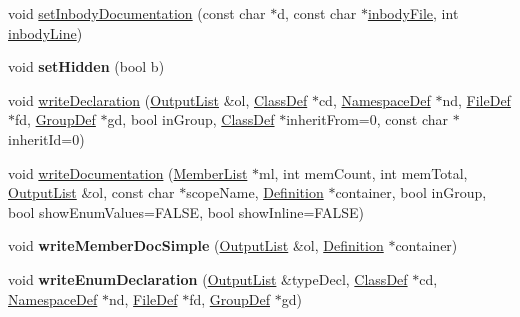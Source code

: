 \begin{DoxyCompactItemize}
void \mbox{\hyperlink{class_member_def_a6c64c400180a47b04ad9a1d18a535184}{set\+Inbody\+Documentation}} (const char $\ast$d, const char $\ast$\mbox{\hyperlink{class_definition_affe50047c647407853ecc16bd99dc2f8}{inbody\+File}}, int \mbox{\hyperlink{class_definition_a59ecd8ca92f7952c598bf01da8ae7582}{inbody\+Line}})
\item 
\mbox{\label{class_member_def_a35f13f7f0e73abea45db7e6794c3fc11}} 
void {\bfseries set\+Hidden} (bool b)
\item 
void \mbox{\hyperlink{class_member_def_a73f56d5c2ca4ec4807a94c272d752e13}{write\+Declaration}} (\mbox{\hyperlink{class_output_list}{Output\+List}} \&ol, \mbox{\hyperlink{class_class_def}{Class\+Def}} $\ast$cd, \mbox{\hyperlink{class_namespace_def}{Namespace\+Def}} $\ast$nd, \mbox{\hyperlink{class_file_def}{File\+Def}} $\ast$fd, \mbox{\hyperlink{class_group_def}{Group\+Def}} $\ast$gd, bool in\+Group, \mbox{\hyperlink{class_class_def}{Class\+Def}} $\ast$inherit\+From=0, const char $\ast$inherit\+Id=0)
\item 
void \mbox{\hyperlink{class_member_def_adec60dcd06f369aff38273e706a062d1}{write\+Documentation}} (\mbox{\hyperlink{class_member_list}{Member\+List}} $\ast$ml, int mem\+Count, int mem\+Total, \mbox{\hyperlink{class_output_list}{Output\+List}} \&ol, const char $\ast$scope\+Name, \mbox{\hyperlink{class_definition}{Definition}} $\ast$container, bool in\+Group, bool show\+Enum\+Values=F\+A\+L\+SE, bool show\+Inline=F\+A\+L\+SE)
\item 
\mbox{\label{class_member_def_a47f1fedac5c58286f964c962632463a7}} 
void {\bfseries write\+Member\+Doc\+Simple} (\mbox{\hyperlink{class_output_list}{Output\+List}} \&ol, \mbox{\hyperlink{class_definition}{Definition}} $\ast$container)
\item 
\mbox{\label{class_member_def_a4dd1663d4ed8cf3a66b2d07d1a63004b}} 
void {\bfseries write\+Enum\+Declaration} (\mbox{\hyperlink{class_output_list}{Output\+List}} \&type\+Decl, \mbox{\hyperlink{class_class_def}{Class\+Def}} $\ast$cd, \mbox{\hyperlink{class_namespace_def}{Namespace\+Def}} $\ast$nd, \mbox{\hyperlink{class_file_def}{File\+Def}} $\ast$fd, \mbox{\hyperlink{class_group_def}{Group\+Def}} $\ast$gd)
\item 
\mbox{\label{class_member_def_a5cfb05e51756a06155166664c3d1854d}} 

\end{DoxyCompactItemize}
